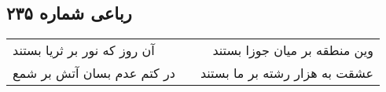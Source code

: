 \begin{center}
\section*{رباعی شماره ۲۳۵}
\label{sec:sh235}
\begin{longtable}{l p{0.5cm} r}
آن روز که نور بر ثریا بستند
&&
وین منطقه بر میان جوزا بستند
\\
در کتم عدم بسان آتش بر شمع
&&
عشقت به هزار رشته بر ما بستند
\\
\end{longtable}
\end{center}
